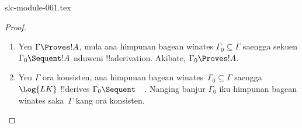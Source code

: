 \begin{filecontents*}[overwrite]{slc-module-061.tex}
\begin{proof}
  \begin{enumerate}
    \item Yen $\Gamma \Proves !A$, mula ana himpunan bagean winates
      $\Gamma_0 \subseteq \Gamma$ saengga sekuen $\Gamma_0
      \Sequent !A$ nduweni !!a{derivation}. Akibate, $\Gamma_0
      \Proves !A$.
    \item Yen $\Gamma$ ora konsisten, ana himpunan bagean
      winates~$\Gamma_0 \subseteq \Gamma$ saengga $\Log{LK}$
      !!{derive}s $\Gamma_0 \Sequent \quad$. Nanging banjur $\Gamma_0$
      iku himpunan bagean winates saka~$\Gamma$ kang ora konsisten.
  \end{enumerate}
\end{proof}


\end{filecontents*}

